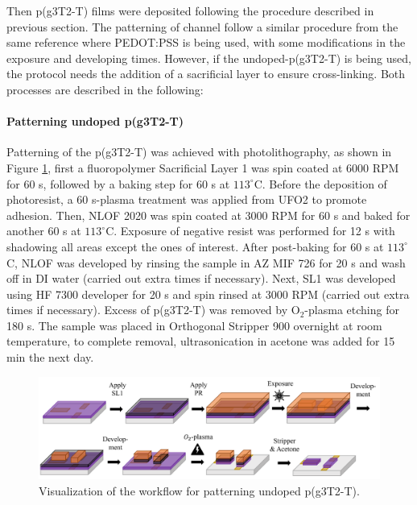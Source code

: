 Then p(g3T2-T) films were deposited following the procedure described in previous section. The patterning of channel follow a similar procedure from the same reference where PEDOT:PSS is being used, with some modifications in the exposure and developing times. However, if the undoped-p(g3T2-T) is being used, the protocol needs the addition of a sacrificial layer to ensure cross-linking. Both processes are described in the following:

\paragraph{Patterning undoped p(g3T2-T)}Patterning of the p(g3T2-T) was achieved with photolithography, as shown in Figure \ref{fig:undopedpat}, first a fluoropolymer Sacrificial Layer 1 was spin coated at 6000 RPM for 60 s, followed by a baking step for 60 s at $113^{\circ}$C. Before the deposition of photoresist, a 60 s-plasma treatment was applied from UFO2 to promote adhesion. Then, NLOF 2020 was spin coated at 3000 RPM for 60 s and baked for another 60 s at $113^{\circ}$C. Exposure of negative resist was performed for 12 s with shadowing all areas except the ones of interest. After post-baking for 60 s at $113^{\circ}$C, NLOF was developed by rinsing the sample in AZ MIF 726 for 20 s and wash off in DI water (carried out extra times if necessary). Next, SL1 was developed using HF 7300 developer for 20 s and spin rinsed at 3000 RPM (carried out extra times if necessary). Excess of p(g3T2-T) was removed by O$_{2}$-plasma etching for 180 s. The sample was placed in Orthogonal Stripper 900 overnight at room temperature, to complete removal, ultrasonication in acetone was added for 15 min the next day. 

\begin{figure}[ht]
	\centering
	\includegraphics[width=\textwidth]{Images/pdf/undoped-patterning.pdf}
	\caption{Visualization of the workflow for patterning undoped p(g3T2-T).}
	\label{fig:undopedpat}
\end{figure}

